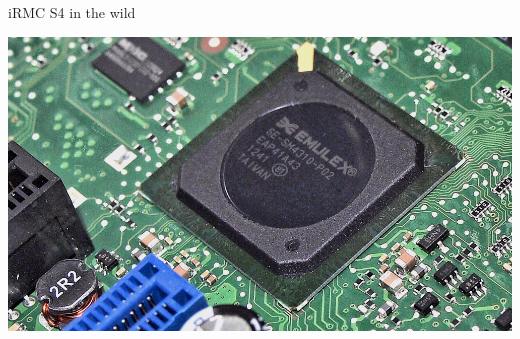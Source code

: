 \documentclass{beamer}
\begin{document}
  \begin{frame}{iRMC S4 in the wild}
	  \begin{center}
		  \includegraphics[scale=0.3]{irmc-s4-chip.png}
	  \end{center}
  \end{frame}
\end{document}
